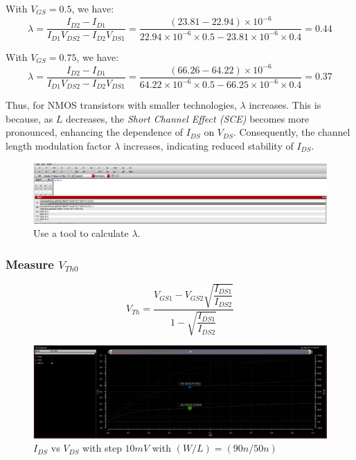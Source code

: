 With $V_{GS} = 0.5$, we have:
\[ \lambda = \dfrac{I_{D2} - I_{D1}}{I_{D1} V_{DS2} - I_{D2} V_{DS1}} = \dfrac{(23.81 - 22.94)\times 10^{-6}}{22.94\times 10^{-6}\times 0.5 - 23.81 \times 10^{-6} \times 0.4 }  = 0.44 \]

With $V_{GS} = 0.75$, we have:
\[ \lambda = \dfrac{I_{D2} - I_{D1}}{I_{D1} V_{DS2} - I_{D2} V_{DS1}} = \dfrac{(66.26 - 64.22)\times 10^{-6}}{64.22 \times 10^{-6}\times 0.5 - 66.25 \times 10^{-6} \times 0.4 }  = 0.37 \]

Thus, for NMOS transistors with smaller technologies, $\lambda$ increases. This is because, as $L$ decreases, the \textit{Short Channel Effect (SCE)} becomes more pronounced, enhancing the dependence of $I_{DS}$ on $V_{DS}$. Consequently, the channel length modulation factor $\lambda$ increases, indicating reduced stability of $I_{DS}$.

\begin{figure}[H]
	\centering
	\includegraphics[width=0.8\linewidth]{sections/pic/EX3_NMOS_tool_cal_lambda.png}
	\caption{Use a tool to calculate $\lambda$.}
	\label{f_EX3_NMOS_tool_cal}
\end{figure}

\subsubsection{Measure $V_{Th0}$}
\[ V_{Th} = \dfrac{V_{GS1} - V_{GS2}\sqrt{\dfrac{I_{DS1}}{I_{DS2}}}}{1 - \sqrt{\dfrac{I_{DS1}}{I_{DS2}}}} \]


\begin{figure}[H]
	\centering
	\includegraphics[width=.6\linewidth]{sections/pic/EX3_NMOS_vth0_(w_l)(90_50).png}
	\caption{$I_{DS}$ vs $V_{DS}$ with step $10mV$ with $(W/L) = (90n/50n)$}
	\label{f_EX3_NMOS_vth0_(w_l)(90_50)}
\end{figure}

